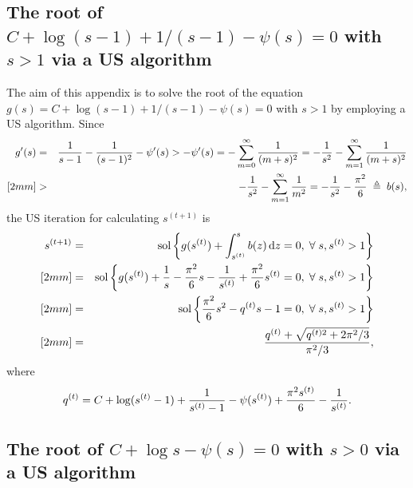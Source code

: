 \subsection{The root of $C+\log(s-1)+1/(s-1)-\psi(s)= 0$ with $s>1$ via a US algorithm}\label{zyf.four.S.sec:US1}  %

The aim of this appendix is to solve the root of the equation $g(s)=C+\log(s-1)+1/(s-1)-\psi(s)= 0$ with $s>1$ by employing a US algorithm. Since
\begin{eqnarray}
   g'(s)&=&\frac{1}{s-1}-\frac{1}{(s-1)^2}-\psi'(s)>-\psi'(s)=-\sum_{m=0}^{\infty}\frac{1}{(m+s)^2}=-\frac{1}{s^2}-\sum_{m=1}^{\infty}\frac{1}{(m+s)^2} \nonumber \\ [2mm]
   &>&-\frac{1}{s^2}-\sum_{m=1}^{\infty}\frac{1}{m^2}=-\frac{1}{s^2}-\frac{\pi^2}{6}\;\triangleq\;b(s), \nonumber
\end{eqnarray}
the US iteration for calculating $s^{(t+1)}$ is
\begin{eqnarray}
   s^{(t+1)}&=&\mbox{sol}\left\{g(s^{(t)})+\int_{s^{(t)}}^{s}b(z)\,\mbox{d} z=0,\;\forall\;s,s^{(t)}>1\right\} \nonumber \\ [2mm]
   &=&\mbox{sol}\left\{g(s^{(t)})+\frac{1}{s}-\frac{\pi^2}{6}s-\frac{1}{s^{(t)}}+\frac{\pi^2}{6}s^{(t)}=0,\;\forall\;s,s^{(t)}>1\right\} \nonumber \\ [2mm]
   &=&\mbox{sol}\left\{\frac{\pi^2}{6}s^2-q^{(t)}s-1=0,\;\forall\;s,s^{(t)}>1\right\} \nonumber \\ [2mm]
   &=&\frac{q^{(t)}+\sqrt{q^{(t)2}+2\pi^2/3}}{\pi^2/3}, \nonumber
\end{eqnarray}
where
\begin{eqnarray}
   q^{(t)}=C+\log(s^{(t)}-1)+\frac{1}{s^{(t)}-1}-\psi(s^{(t)})+\frac{\pi^2s^{(t)}}{6}-\frac{1}{s^{(t)}}. \nonumber
\end{eqnarray}

\subsection{The root of $C+\log s-\psi(s)= 0$ with $s>0$ via a US algorithm}\label{zyf.four.S.sec:US2}  %

